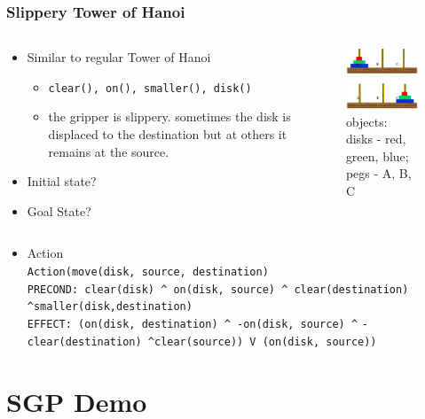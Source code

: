 \documentclass[compress, 9pt]{beamer}
\begin{document}
\begin{frame}
\frametitle{Slippery Tower of Hanoi}
\label{sec-1-5}
\begin{columns}
\begin{column}{0.5\textwidth}
\label{sec-1-5-1}
\begin{itemize}

\item <1-> Similar to regular Tower of Hanoi
\label{sec-1-5-1-1}%
\begin{itemize}
\item \texttt{clear(), on(), smaller(), disk()}
\item the gripper is slippery. sometimes the disk is displaced to the
    destination but at others it remains at the source.
\end{itemize}

\item <2-> Initial state?
\label{sec-1-5-1-2}%

\item <3-> Goal State?
\label{sec-1-5-1-3}%
\end{itemize} %
\end{column}
\begin{column}{0.5\textwidth}
\label{sec-1-5-2}

\begin{figure}[htb]
\centering
\includegraphics[width=5cm]{../images/torrehanoi.png}
\caption{objects: disks - red, green, blue; pegs - A, B, C}
\end{figure}
\end{column}
\end{columns}
\label{sec-1-5-3}
\begin{itemize}

\item <4-> Action\\
\label{sec-1-5-3-1}%
\texttt{Action(move(disk, source, destination)}\\
             \texttt{PRECOND: clear(disk) \textasciicircum{} on(disk, source) \textasciicircum{} clear(destination)     \textasciicircum{}smaller(disk,destination)}\\
             \texttt{EFFECT: (on(disk, destination) \textasciicircum{} -on(disk, source) \textasciicircum{}}
             \texttt{-clear(destination) \textasciicircum{}clear(source)) V (on(disk, source))}
\end{itemize} %
\end{frame}
\section{SGP Demo}
\label{sec-2}
\end{document}
